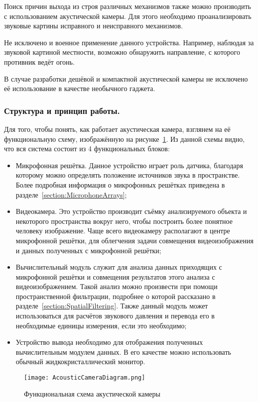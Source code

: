 Поиск причин выхода из строя различных механизмов также можно производить с использованием акустической камеры. Для этого необходимо проанализировать звуковые картины исправного и неисправного механизмов.

Не исключено и военное применение данного устройства. Например, наблюдая за звуковой картиной местности, возможно обнаружить направление, с которого противник ведёт огонь.

В случае разработки дешёвой и компактной акустической камеры не исключено её использование в качестве необычного гаджета.

\subsubsection{Структура и принцип работы. }
Для того, чтобы понять, как работает акустическая камера, взглянем на её функциональную схему, изображённую на рисунке~\ref{fig:AcousticCameraDiagram}. Из данной схемы видно, что вся система состоит из 4 функциональных блоков:
\begin{itemize}
	\item Микрофонная решётка. Данное устройство играет роль датчика, благодаря которому можно определять положение источников звука в пространстве. Более подробная информация о микрофонных решётках приведена в разделе~\ref{section:MicrophoneArrays};
	\item Видеокамера. Это устройство производит съёмку анализируемого объекта и некоторого пространства вокруг него, чтобы построить более понятное человеку изображение. Чаще всего видеокамеру располагают в центре микрофонной решётки, для облегчения задачи совмещения видеоизображения и данных полученных с микрофонной решётки;
	\item Вычислительный модуль служит для анализа данных приходящих с микрофонной решётки и совмещения результатов этого анализа с видеоизображением. Такой анализ можно произвести при помощи пространственной фильтрации, подробнее о которой рассказано в разделе~\ref{section:SpatialFiltering}. Также данный модуль может использоваться для расчётов звукового давления и перевода его в необходимые единицы измерения, если это необходимо;
	\item Устройство вывода необходимо для отображения полученных вычислительным модулем данных. В его качестве можно использовать обычный жидкокристаллический монитор.
\end{itemize}

\begin{figure}[ht]
	\centering
	\texttt{[image: AcousticCameraDiagram.png]}  
	\caption{Функциональная схема акустической камеры}
	\label{fig:AcousticCameraDiagram}
\end{figure}

